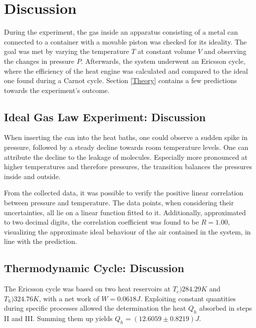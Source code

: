 \newpage
\section{Discussion}
\label{Discussion}

During the experiment, the gas inside an apparatus consisting of a metal can connected to a container with a movable piston was checked for its ideality. The goal was met by varying the temperature $\mathit{T}$ at constant volume $\mathit{V}$ and observing the changes in pressure $\mathit{P}$. Afterwards, the system underwent an Ericsson cycle, where the efficiency of the heat engine was calculated and compared to the ideal one found during a Carnot cycle. Section \ref{Theory} contains a few predictions towards the experiment's outcome.

\subsection{Ideal Gas Law Experiment: Discussion}
\label{Ideal Gas Discussion}

When inserting the can into the heat baths, one could observe a sudden spike in pressure, followed by a steady decline towards room temperature levels. One can attribute the decline to the leakage of molecules. Especially more pronounced at higher temperatures and therefore pressures, the transition balances the pressures inside and outside.

From the collected data, it was possible to verify the positive linear correlation between pressure and temperature. The data points, when considering their uncertainties, all lie on a linear function fitted to it. Additionally, approximated to two decimal digits, the correlation coefficient was found to be $\mathit{R=1.00}$, visualizing the approximate ideal behaviour of the air contained in the system, in line with the prediction.

\subsection{Thermodynamic Cycle: Discussion}
\label{Thermodynamic Cycle Discussion}

The Ericsson cycle was based on two heat reservoirs at $\mathit{T_c} ) 284.29 K$ and $\mathit{T_h} ) 324.76 K$, with a net work of $\mathit{W=0.0618J}$. Exploiting constant quantities during specific processes allowed the determination the heat $\mathit{Q_h}$ absorbed in steps II and III. Summing them up yields $\mathit{Q_h = (12.6059 \pm 0.8219) J}$.

